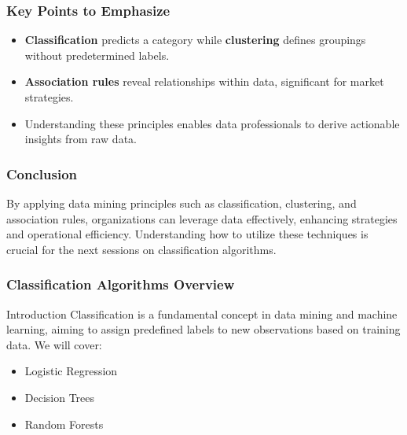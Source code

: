 \documentclass[aspectratio=169]{beamer}
\begin{document}
\begin{frame}[fragile]
    \frametitle{Key Points to Emphasize}
    \begin{itemize}
        \item \textbf{Classification} predicts a category while \textbf{clustering} defines groupings without predetermined labels.
        \item \textbf{Association rules} reveal relationships within data, significant for market strategies.
        \item Understanding these principles enables data professionals to derive actionable insights from raw data.
    \end{itemize}
\end{frame}

\begin{frame}[fragile]
    \frametitle{Conclusion}
    By applying data mining principles such as classification, clustering, and association rules, organizations can leverage data effectively, enhancing strategies and operational efficiency.
    Understanding how to utilize these techniques is crucial for the next sessions on classification algorithms.
\end{frame}

\begin{frame}[fragile]
    \frametitle{Classification Algorithms Overview}
    \begin{block}{Introduction}
        Classification is a fundamental concept in data mining and machine learning, aiming to assign predefined labels to new observations based on training data. 
        We will cover:
        \begin{itemize}
            \item Logistic Regression
            \item Decision Trees
            \item Random Forests
        \end{itemize}
    \end{block}
\end{frame}
\end{document}
